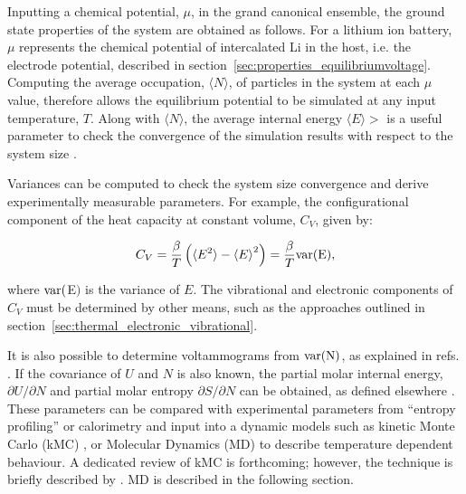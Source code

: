 \documentclass[../main.tex]{subfiles}
\begin{document}
Inputting a chemical potential, $\mu$, in the grand canonical ensemble, the ground state properties of the system are obtained as follows. For a lithium ion battery, $\mu$ represents the chemical potential of intercalated Li in the host, i.e. the electrode potential, described in section~\ref{sec:properties_equilibriumvoltage}. Computing the average occupation, $\langle N \rangle$, of particles in the system at each $\mu$ value, therefore allows the equilibrium potential to be simulated at any input temperature, $T$. Along with $\langle N \rangle$, the average internal energy $\langle{E}\rangle>$ is a useful parameter to check the convergence of the simulation results with respect to the system size \cite{mercer_influence_2017,Binder2009book,Kim2001ThermodynamicAK,darling1999}.

Variances can be computed to check the system size convergence and derive experimentally measurable parameters. For example, the configurational component of the heat capacity at constant volume, $C_{V}$, given by:

\begin{equation}
    C_{V} = \frac{\beta}{T}\left(\langle{E^{2}}\rangle -{\langle{E}\rangle}^{2}\right) =  \frac{\beta}{T}\rm{var}(E),
    \label{eq:mc_heat_cap}
\end{equation}

where $\rm{var}($E$)$ is the variance of $E$. The vibrational and electronic components of $C_{V}$ must be determined by other means, such as the approaches outlined in section~\ref{sec:thermal_electronic_vibrational}. 

It is also possible to determine voltammograms from $\rm{var}(N)$, as explained in refs. \cite{mercer_influence_2017,darling1999}. If the covariance of $U$ and $N$ is also known, the partial molar internal energy, $\partial{U}/\partial{N}$ and partial molar entropy $\partial{S}/\partial{N}$ can be obtained, as defined elsewhere \cite{mercer_influence_2017,Kim2001ThermodynamicAK}. These parameters can be compared with experimental parameters from ``entropy profiling'' or calorimetry \cite{mercer_influence_2017,schlueter_quantifying_2018,Mercer2019,THOMAS2003844} and input into a dynamic models such as kinetic Monte Carlo (kMC) \cite{gavilan-arriazu_kinetic_2020,darling1999,gavilan-arriazu_effect_2020,persson2010}, or Molecular Dynamics (MD) to describe temperature dependent behaviour. A dedicated review of kMC is forthcoming; however, the technique is briefly described by \citeauthor{VanderVen2020}. \cite{VanderVen2020} MD is described in the following section.
\end{document}
